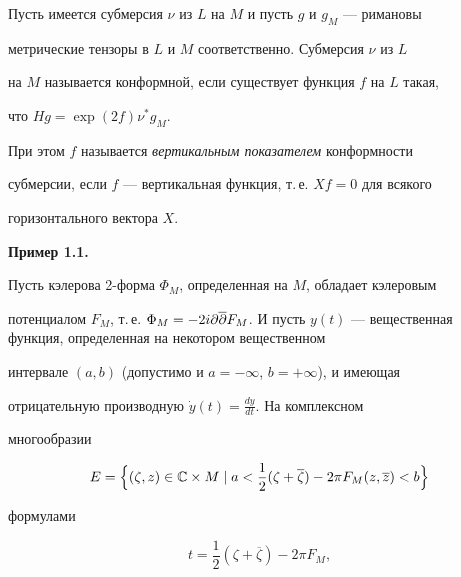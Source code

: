 \begin{defns}\label{df1.1}


Пусть имеется субмерсия $\nu$ из $L$ на $M$ и пусть $g$ и $g_M$ --- римановы


метрические тензоры в $L$ и $M$ соответственно. Субмерсия $\nu$ из $L$


на $M$ называется конформной, если существует функция $f$ на $L$ такая,


что $Hg=\exp (2f)\nu^*g_M$.


\end{defns}





При этом $f$ называется {\it вертикальным показателем} конформности


субмерсии, если $f$ --- вертикальная функция, т.\,е. $Xf=0$ для всякого


горизонтального вектора $X$.


\medskip





{\bf Пример 1.1.}


Пусть кэлерова 2-форма $\Phi_M$, определенная на $M$, обладает кэлеровым


потенциалом $F_M$, т.\,е. $\Phi_M=-2i\partial \Olpat F_M$. И пусть $y(t)


$ --- вещественная функция, определенная на некотором вещественном


интервале $(a,b)$ (допустимо и $a=-\infty$, $b=+\infty$), и имеющая


отрицательную производную $\Dot y(t)=\frac{dy}{dt}$. На комплексном


многообразии


\begin{equation}


E=\Big\{ (\zeta ,z)\in \Bbb C \times M \mid a<\frac12(\zeta +


\overline{\zeta })-2\pi F_M(z,\overline{z})<b\Big\}


\label{1.3}


\end{equation}


формулами


\begin{equation}


t=\frac12(\zeta+\overline{\zeta })-2\pi F_M,


\label{1.2}


\end{equation}


